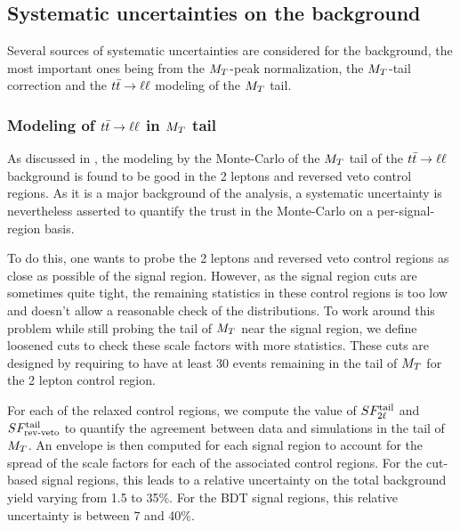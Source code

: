     \subsection{Systematic uncertainties on the background \label{sec:background_systematics}}

    Several sources of systematic uncertainties are considered for the background,
    the most important ones being from the $M_T$-peak normalization, the $M_T$-tail
    correction and the $t\bar{t} \rightarrow \ell \ell$ modeling of the $M_T$ tail.

    \subsubsection{Modeling of $t\bar{t} \rightarrow \ell \ell$ in $M_T$ tail}

    As discussed in , the modeling by
    the Monte-Carlo of the $M_T$ tail of the $t\bar{t} \rightarrow \ell \ell$ background is found
    to be good in the 2 leptons and reversed veto control regions. As it is a
    major background of the analysis, a systematic uncertainty is nevertheless
    asserted to quantify the trust in the Monte-Carlo on a per-signal-region basis.

    To do this, one wants to probe the 2 leptons and reversed veto control regions
    as close as possible of the signal region. However, as the signal region cuts
    are sometimes quite tight, the remaining statistics in these control regions is
    too low and doesn't allow a reasonable check of the distributions. To work
    around this problem while still probing the tail of $M_T$ near the signal
    region, we define loosened cuts to check these scale factors with more
    statistics. These cuts are designed by requiring to have at least 30 events
    remaining in the tail of $M_T$ for the 2 lepton control region.

    For each of the relaxed control regions, we compute the value of $SF_{2\ell}^{\text{tail}}$
    and $SF_{\text{rev-veto}}^{\text{tail}}$ to quantify the agreement between data and simulations in
    the tail of $M_T$. An envelope is then computed for each signal
    region to account for the spread of the scale factors for each of the
    associated control regions. For the cut-based signal regions, this leads to a
    relative uncertainty on the total background yield varying from 1.5 to 35\%. For the
    BDT signal regions, this relative uncertainty is between 7 and 40\%.

